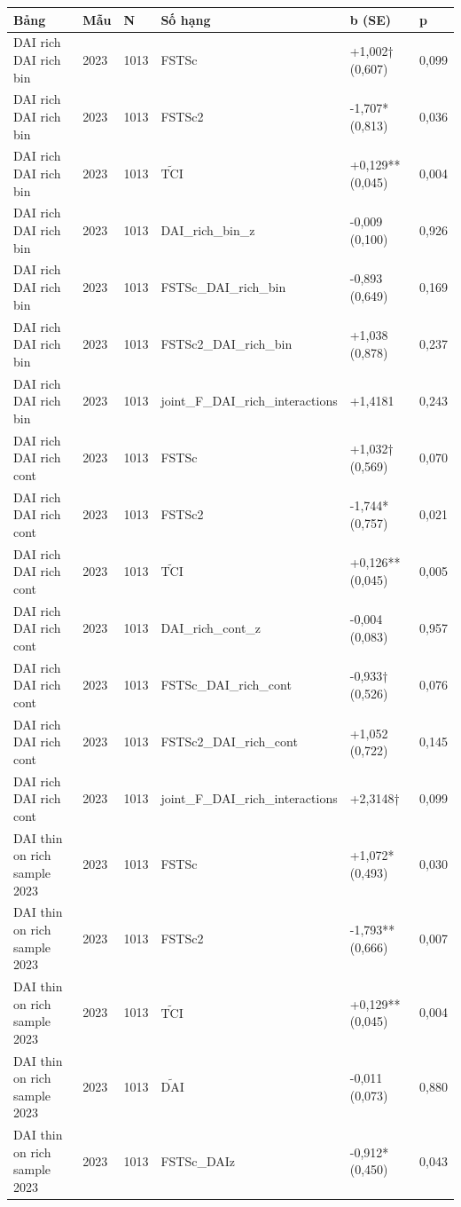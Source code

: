 \documentclass[12pt,a4paper]{article}
\begin{document}
\begin{longtable}[]{@{}llllll@{}}
\toprule\noalign{}
Bảng & Mẫu & N & Số hạng & b (SE) & p \\
\midrule\noalign{}
\endhead
\bottomrule\noalign{}
\endlastfoot
DAI rich DAI rich bin & 2023 & 1013 & FSTSc & +1,002† (0,607) & 0,099 \\
DAI rich DAI rich bin & 2023 & 1013 & FSTSc2 & -1,707* (0,813) &
0,036 \\
DAI rich DAI rich bin & 2023 & 1013 & \(\tilde{\mathrm{TCI}}\) &
+0,129** (0,045) & 0,004 \\
DAI rich DAI rich bin & 2023 & 1013 & DAI\_rich\_bin\_z & -0,009 (0,100)
& 0,926 \\
DAI rich DAI rich bin & 2023 & 1013 & FSTSc\_DAI\_rich\_bin & -0,893
(0,649) & 0,169 \\
DAI rich DAI rich bin & 2023 & 1013 & FSTSc2\_DAI\_rich\_bin & +1,038
(0,878) & 0,237 \\
DAI rich DAI rich bin & 2023 & 1013 & joint\_F\_DAI\_rich\_interactions
& +1,4181 & 0,243 \\
DAI rich DAI rich cont & 2023 & 1013 & FSTSc & +1,032† (0,569) &
0,070 \\
DAI rich DAI rich cont & 2023 & 1013 & FSTSc2 & -1,744* (0,757) &
0,021 \\
DAI rich DAI rich cont & 2023 & 1013 & \(\tilde{\mathrm{TCI}}\) &
+0,126** (0,045) & 0,005 \\
DAI rich DAI rich cont & 2023 & 1013 & DAI\_rich\_cont\_z & -0,004
(0,083) & 0,957 \\
DAI rich DAI rich cont & 2023 & 1013 & FSTSc\_DAI\_rich\_cont & -0,933†
(0,526) & 0,076 \\
DAI rich DAI rich cont & 2023 & 1013 & FSTSc2\_DAI\_rich\_cont & +1,052
(0,722) & 0,145 \\
DAI rich DAI rich cont & 2023 & 1013 & joint\_F\_DAI\_rich\_interactions
& +2,3148† & 0,099 \\
DAI thin on rich sample 2023 & 2023 & 1013 & FSTSc & +1,072* (0,493) &
0,030 \\
DAI thin on rich sample 2023 & 2023 & 1013 & FSTSc2 & -1,793** (0,666) &
0,007 \\
DAI thin on rich sample 2023 & 2023 & 1013 & \(\tilde{\mathrm{TCI}}\) &
+0,129** (0,045) & 0,004 \\
DAI thin on rich sample 2023 & 2023 & 1013 & \(\tilde{\mathrm{DAI}}\) &
-0,011 (0,073) & 0,880 \\
DAI thin on rich sample 2023 & 2023 & 1013 & FSTSc\_DAIz & -0,912*
(0,450) & 0,043 \\

\end{longtable}
\end{document}
